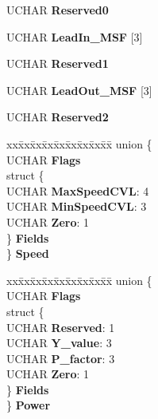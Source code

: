 \begin{DoxyCompactItemize}
\begin{tabbing}
\end{tabbing}\item 
\mbox{\label{struct___r_e_a_d___t_o_c___a_t_i_p_a31a72d5f8179f1ea714e8fb57a10b194}} 
U\+C\+H\+AR {\bfseries Reserved0}
\item 
\mbox{\label{struct___r_e_a_d___t_o_c___a_t_i_p_a276bf591e351c3287a7ae18bb01c9c80}} 
U\+C\+H\+AR {\bfseries Lead\+In\+\_\+\+M\+SF} \mbox{[}3\mbox{]}
\item 
\mbox{\label{struct___r_e_a_d___t_o_c___a_t_i_p_a60a0d0f24918025218d437b0a5b40103}} 
U\+C\+H\+AR {\bfseries Reserved1}
\item 
\mbox{\label{struct___r_e_a_d___t_o_c___a_t_i_p_a549ccdb137cc5de05dc9a7a480bea82a}} 
U\+C\+H\+AR {\bfseries Lead\+Out\+\_\+\+M\+SF} \mbox{[}3\mbox{]}
\item 
\mbox{\label{struct___r_e_a_d___t_o_c___a_t_i_p_ad91fe4e9402278b755dee64f114b9fb2}} 
U\+C\+H\+AR {\bfseries Reserved2}
\item 
\mbox{\label{struct___r_e_a_d___t_o_c___a_t_i_p_a267a9075fdb40cfa0b90a750ed9e1caf}} 
\begin{tabbing}
xx\=xx\=xx\=xx\=xx\=xx\=xx\=xx\=xx\=\kill
union \{\\
\>UCHAR {\bfseries Flags}\\
\>struct \{\\
\>\>UCHAR {\bfseries MaxSpeedCVL}: 4\\
\>\>UCHAR {\bfseries MinSpeedCVL}: 3\\
\>\>UCHAR {\bfseries Zero}: 1\\
\>\} {\bfseries Fields}\\
\} {\bfseries Speed}\\

\end{tabbing}\item 
\mbox{\label{struct___r_e_a_d___t_o_c___a_t_i_p_a7fe07620ef18165ac23edc8f69d58b78}} 
\begin{tabbing}
xx\=xx\=xx\=xx\=xx\=xx\=xx\=xx\=xx\=\kill
union \{\\
\>UCHAR {\bfseries Flags}\\
\>struct \{\\
\>\>UCHAR {\bfseries Reserved}: 1\\
\>\>UCHAR {\bfseries Y\_value}: 3\\
\>\>UCHAR {\bfseries P\_factor}: 3\\
\>\>UCHAR {\bfseries Zero}: 1\\
\>\} {\bfseries Fields}\\
\} {\bfseries Power}\\


\end{tabbing}
\end{DoxyCompactItemize}
